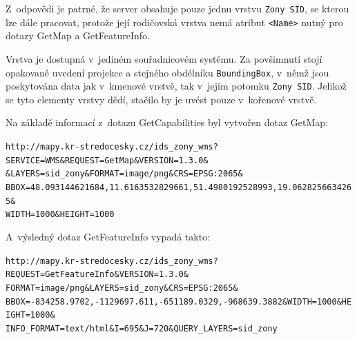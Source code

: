 \documentclass[a4paper,12pt]{article}
\begin{document}
Z~odpovědi je patrné, že server obsahuje pouze jednu vrstvu {\tt Zony SID},
se kterou lze dále pracovat, protože její rodičovská vrstva nemá
atribut {\tt <Name>} nutný pro dotazy GetMap a GetFeatureInfo.

Vrstva je dostupná v~jediném souřadnicovém systému. Za povšimnutí
stojí opakované uvedení projekce a stejného obdélníku
{\tt BoundingBox}, v~němž jsou poskytována data jak v~kmenové vrstvě, tak
v~jejím potomku {\tt Zony SID}. Jelikož se tyto elementy vrstvy dědí, stačilo
by je uvést pouze v~kořenové vrstvě.

Na základě informací z~dotazu GetCapabilities byl vytvořen dotaz
GetMap:

\begin{alltt}\footnotesize
http://mapy.kr-stredocesky.cz/ids\_zony\_wms?
SERVICE=WMS\&REQUEST=GetMap\&VERSION=1.3.0\&
&LAYERS=sid_zony\&FORMAT=image/png&CRS=EPSG:2065\&
BBOX=48.093144621684,11.6163532829661,51.4980192528993,19.0628256634265\&
WIDTH=1000\&HEIGHT=1000
 \end{alltt}

A~výsledný dotaz GetFeatureInfo vypadá takto:
\begin{alltt}\footnotesize
http://mapy.kr-stredocesky.cz/ids\_zony\_wms?
REQUEST=GetFeatureInfo\&VERSION=1.3.0\&
FORMAT=image/png\&LAYERS=sid\_zony\&CRS=EPSG:2065\&
BBOX=-834258.9702,-1129697.611,-651189.0329,-968639.3882\&WIDTH=1000\&HEIGHT=1000\&
INFO\_FORMAT=text/html\&I=695\&J=720\&QUERY\_LAYERS=sid\_zony
\end{alltt}
\end{document}

